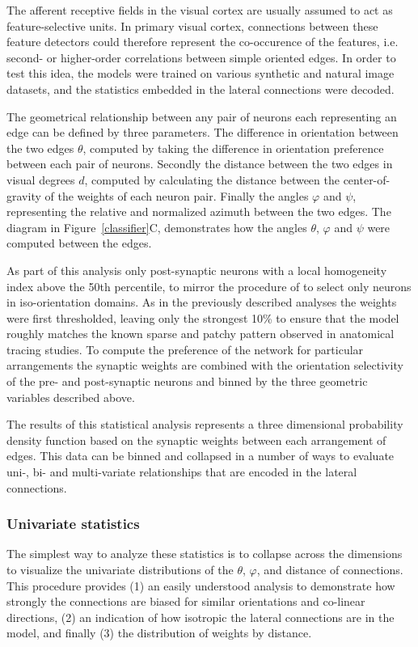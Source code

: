 The afferent receptive fields in the visual cortex are usually assumed
to act as feature-selective units. In primary visual cortex,
connections between these feature detectors could therefore represent
the co-occurence of the features, i.e. second- or higher-order
correlations between simple oriented edges. In order to test this
idea, the models were trained on various synthetic and natural image
datasets, and the statistics embedded in the lateral connections were
decoded.

The geometrical relationship between any pair of neurons each
representing an edge can be defined by three parameters. The
difference in orientation between the two edges $\theta$, computed by
taking the difference in orientation preference between each pair of
neurons. Secondly the distance between the two edges in visual degrees
$d$, computed by calculating the distance between the
center-of-gravity of the weights of each neuron pair. Finally the
angles $\varphi$ and $\psi$, representing the relative and normalized
azimuth between the two edges. The diagram in
Figure~\ref{classifier}C, demonstrates how the angles $\theta$, $\varphi$
and $\psi$ were computed between the edges.

As part of this analysis only post-synaptic neurons with a local
homogeneity index above the 50th percentile, to mirror the procedure
of \cite{Bosking1997} to select only neurons in iso-orientation
domains. As in the previously described analyses the weights were
first thresholded, leaving only the strongest 10\% to ensure that the
model roughly matches the known sparse and patchy pattern observed in
anatomical tracing studies. To compute the preference of the network
for particular arrangements the synaptic weights are combined with the
orientation selectivity of the pre- and post-synaptic neurons and
binned by the three geometric variables described above.

The results of this statistical analysis represents a three
dimensional probability density function based on the synaptic weights
between each arrangement of edges. This data can be binned and
collapsed in a number of ways to evaluate uni-, bi- and multi-variate
relationships that are encoded in the lateral connections.

\subsubsection*{Univariate statistics}

The simplest way to analyze these statistics is to collapse across the
dimensions to visualize the univariate distributions of the $\theta$,
$\varphi$, and distance of connections. This procedure provides (1) an
easily understood analysis to demonstrate how strongly the connections
are biased for similar orientations and co-linear directions, (2) an
indication of how isotropic the lateral connections are in the model,
and finally (3) the distribution of weights by distance.

